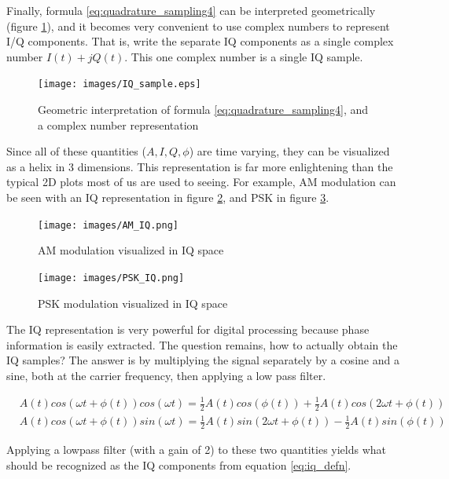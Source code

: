 \documentclass[a4paper, 12pt, notitlepage]{article}
\begin{document}
Finally, formula \ref{eq:quadrature_sampling4} can be interpreted geometrically (figure \ref{fig:quadrature_sampling}), and it becomes very convenient to use complex numbers to represent I/Q components.  That is, write the separate IQ components as a single complex number $I(t) + jQ(t)$.  This one complex number is a single IQ sample.

\begin{figure}[h]
\caption{Geometric interpretation of formula \ref{eq:quadrature_sampling4}, and a complex number representation}
\label{fig:quadrature_sampling}
\centering
\texttt{[image: images/IQ\_sample.eps]}
\end{figure}

Since all of these quantities ($A, I, Q, \phi$) are time varying, they can be visualized as a helix in 3 dimensions.  This representation is far more enlightening than the typical 2D plots most of us are used to seeing.  For example, AM modulation can be seen with an IQ representation in figure \ref{fig:am_iq}, and PSK in figure \ref{fig:psk_iq}.

\begin{figure}[ht]
\caption{AM modulation visualized in IQ space}
\label{fig:am_iq}
\centering
\texttt{[image: images/AM\_IQ.png]}
\end{figure}

\begin{figure}[ht]
\caption{PSK modulation visualized in IQ space}
\label{fig:psk_iq}
\centering
\texttt{[image: images/PSK\_IQ.png]}
\end{figure}

The IQ representation is very powerful for digital processing because phase information is easily extracted.  The question remains, how to actually obtain the IQ samples?  The answer is by multiplying the signal separately by a cosine and a sine, both at the carrier frequency, then applying a low pass filter.

\begin{equation*}
\label{eq:quadrature_sampling5}
\begin{aligned}
  &A(t)cos(\omega t + \phi(t))cos(\omega t) = \frac{1}{2}A(t)cos(\phi(t)) + \frac{1}{2}A(t)cos(2\omega t + \phi (t))\\
  &A(t)cos(\omega t + \phi(t))sin(\omega t) = \frac{1}{2}A(t)sin(2\omega t + \phi(t)) - \frac{1}{2}A(t)sin(\phi(t))
\end{aligned}
\end{equation*}

Applying a lowpass filter (with a gain of 2) to these two quantities yields what should be recognized as the IQ components from equation \ref{eq:iq_defn}.
\end{document}
